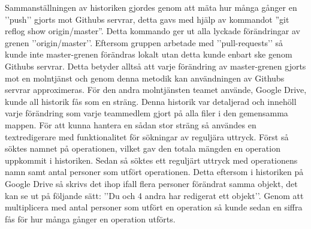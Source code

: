 Sammanställningen av historiken gjordes genom att mäta hur många gånger en ’’push’’ gjorts mot Githubs servrar, detta gavs med hjälp av kommandot ”git reflog show origin/master”. Detta kommando ger ut alla lyckade förändringar av grenen ’’origin/master’’. Eftersom gruppen arbetade med ’’pull-requests’’ så kunde inte master-grenen förändras lokalt utan detta kunde enbart ske genom Githubs servrar. Detta betyder alltså att varje förändring av master-grenen gjorts mot en molntjänst och genom denna metodik kan användningen av Githubs servrar approximeras. För den andra molntjänsten teamet använde, Google Drive, kunde all historik fås som en sträng. Denna historik var detaljerad och innehöll varje förändring som varje teammedlem gjort på alla filer i den gemensamma mappen. För att kunna hantera en sådan stor sträng så användes en textredigerare med funktionalitet för sökningar av reguljära uttryck. Först så söktes namnet på operationen, vilket gav den totala mängden en operation uppkommit i historiken. Sedan så söktes ett reguljärt uttryck med operationens namn samt antal personer som utfört operationen. Detta eftersom i historiken på Google Drive så skrivs det ihop ifall flera personer förändrat samma objekt, det kan se ut på följande sätt: ’’Du och 4 andra har redigerat ett objekt’’. Genom att multiplicera med antal personer som utfört en operation så kunde sedan en siffra fås för hur många gånger en operation utförts.

